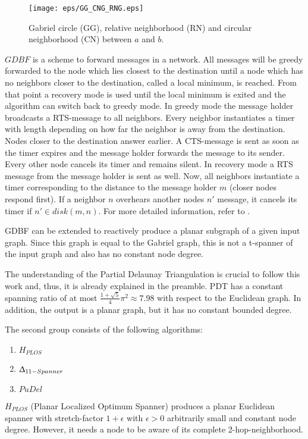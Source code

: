 \begin{figure}[h!]
\centering
\texttt{[image: eps/GG\_CNG\_RNG.eps]}
\caption{Gabriel circle (GG), relative neighborhood (RN) and circular neighborhood (CN) between $a $ and $b $.}
\label{fig:GG_CNG_RNG}
\end{figure}

$GDBF $ is a scheme to forward messages in a network.
All messages will be greedy forwarded to the node which lies closest to the destination until a node which has no neighbors closer to the destination, called a local minimum, is reached.
From that point a recovery mode is used until the local minimum is exited and the algorithm can switch back to greedy mode.
In greedy mode the message holder broadcasts a RTS-message to all neighbors.
Every neighbor instantiates a timer with length depending on how far the neighbor is away from the destination. 
Nodes closer to the destination answer earlier.
A CTS-message is sent as soon as the timer expires and the message holder forwards the message to its sender. 
Every other node cancels its timer and remains silent.
In recovery mode a RTS message from the message holder is sent as well.
Now, all neighbors instantiate a timer corresponding to the distance to the message holder $m $ (closer nodes respond first).
If a neighbor $n $ overhears another nodes $n' $ message, it cancels its timer if $n' \in disk(m, n) $.
For more detailed information, refer to \cite{Chawla2006}.

GDBF can be extended to reactively produce a planar subgraph of a given input graph. 
Since this graph is equal to the Gabriel graph, this is not a t-spanner of the input graph and also has no constant node degree.

The understanding of the Partial Delaunay Triangulation is crucial to follow this work and, thus, it is already explained in the preamble.
PDT has a constant spanning ratio of at most $\frac{1+\sqrt{5}}{4}\pi^2 \approx 7.98 $ with respect to the Euclidean graph.
In addition, the output is a planar graph, but it has no constant bounded degree.


The second group consists of the following algorithms:
\begin{enumerate}
\item $H_{PLOS} $
\item $\Updelta _{11-Spanner} $
\item $PuDel $
\end{enumerate}

$H_{PLOS} $ (Planar Localized Optimum Spanner)\cite{Damian2010} produces a planar Euclidean spanner with stretch-factor $1+ \epsilon $ with $\epsilon >0 $ arbitrarily small and constant node degree.
However, it needs a node to be aware of its complete 2-hop-neighborhood.

